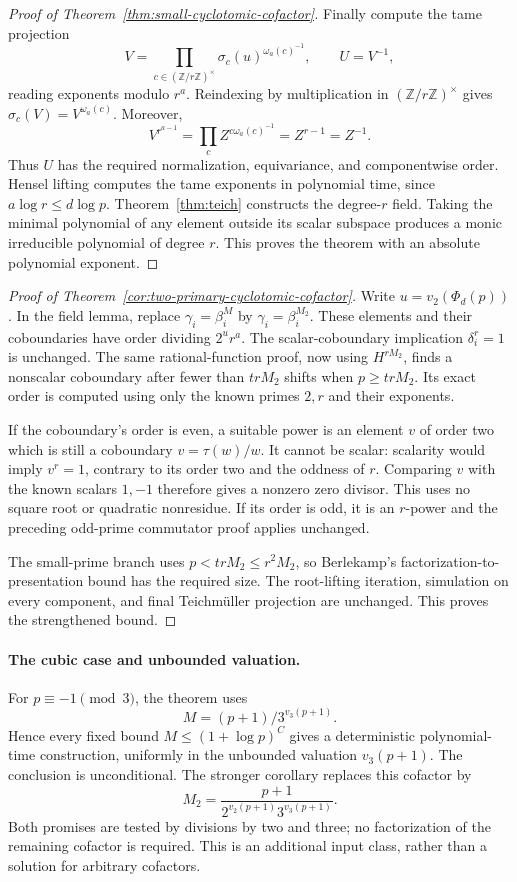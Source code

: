 \documentclass[11pt]{article}
\theoremstyle{definition}
\theoremstyle{remark}
\begin{document}
\begin{proof}[Proof of Theorem~\ref{thm:small-cyclotomic-cofactor}]
Finally compute the tame projection
\[
 V=\prod_{c\in(\mathbb Z/r\mathbb Z)^\times}
           \sigma_c(u)^{\omega_a(c)^{-1}},\qquad U=V^{-1},
\]
reading exponents modulo \(r^a\). Reindexing by multiplication
in \((\mathbb Z/r\mathbb Z)^\times\) gives
\(\sigma_c(V)=V^{\omega_a(c)}\). Moreover,
\[
 V^{r^{a-1}}
   =\prod_c Z^{c\omega_a(c)^{-1}}
   =Z^{r-1}=Z^{-1}.
\]
Thus \(U\) has the required normalization, equivariance,
and componentwise order. Hensel lifting computes the tame
exponents in polynomial time, since \(a\log r\leq d\log p\).
Theorem~\ref{thm:teich} constructs the degree-\(r\) field.
Taking the minimal polynomial of any element outside its
scalar subspace produces a monic irreducible polynomial of
degree \(r\). This proves the theorem with an absolute
polynomial exponent.
\end{proof}

\begin{proof}[Proof of Theorem~\ref{cor:two-primary-cyclotomic-cofactor}]
Write \(u=v_2(\Phi_d(p))\). In the field lemma, replace
\(\gamma_i=\beta_i^M\) by \(\gamma_i=\beta_i^{M_2}\).
These elements and their coboundaries have order dividing
\(2^u r^a\). The scalar-coboundary implication
\(\delta_i^r=1\) is unchanged. The same rational-function
proof, now using \(H^{rM_2}\), finds a nonscalar coboundary
after fewer than \(trM_2\) shifts when \(p\geq trM_2\).
Its exact order is computed using only the known primes
\(2,r\) and their exponents.

If the coboundary's order is even, a suitable power is an
element \(v\) of order two which is still a coboundary
\(v=\tau(w)/w\). It cannot be scalar: scalarity would imply
\(v^r=1\), contrary to its order two and the oddness of
\(r\). Comparing \(v\) with the known scalars \(1,-1\)
therefore gives a nonzero zero divisor. This uses no square
root or quadratic nonresidue. If its order is odd, it is an
\(r\)-power and the preceding odd-prime commutator proof
applies unchanged.

The small-prime branch uses \(p<trM_2\leq r^2M_2\), so
Berlekamp's factorization-to-presentation bound has the required
size. The root-lifting iteration, simulation on every component,
and final Teichm\"uller projection are unchanged. This proves
the strengthened bound.
\end{proof}

\paragraph{The cubic case and unbounded valuation.}
For \(p\equiv-1\pmod3\), the theorem uses
\[
             M=(p+1)/3^{v_3(p+1)}.
\]
Hence every fixed bound \(M\leq(1+\log p)^C\) gives a
deterministic polynomial-time construction, uniformly in the
unbounded valuation \(v_3(p+1)\). The conclusion is
unconditional. The stronger corollary replaces this cofactor by
\[
 M_2=\frac{p+1}{2^{v_2(p+1)}3^{v_3(p+1)}}.
\]
Both promises are tested by divisions by two and three;
no factorization of the remaining cofactor is required.
This is an additional input class, rather than a solution
for arbitrary cofactors.
\end{document}
